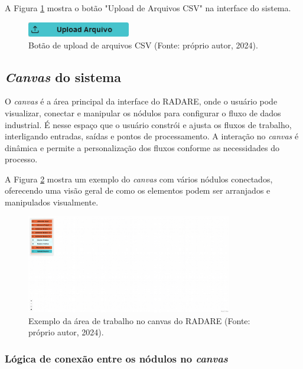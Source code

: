 A Figura \ref{Fig:UploadCSVButton} mostra o botão "Upload de Arquivos CSV" na interface do sistema.

\begin{figure}[htbp]
    \centering
    \includegraphics[width=0.4\textwidth]{figuras/upload-csv-button.png}
    \caption{Botão de upload de arquivos CSV (Fonte: próprio autor, 2024).}
    \label{Fig:UploadCSVButton}
\end{figure}

\subsection{\textit{Canvas} do sistema}

O \textit{canvas} é a área principal da interface do RADARE, onde o usuário pode visualizar, conectar e manipular os nódulos para configurar o fluxo de dados industrial. É nesse espaço que o usuário constrói e ajusta os fluxos de trabalho, interligando entradas, saídas e pontos de processamento. A interação no \textit{canvas} é dinâmica e permite a personalização dos fluxos conforme as necessidades do processo.

A Figura \ref{Fig:EmptyCanvas} mostra um exemplo do \textit{canvas} com vários nódulos conectados, oferecendo uma visão geral de como os elementos podem ser arranjados e manipulados visualmente.

\begin{figure}[htbp]
    \centering
    \includegraphics[width=0.8\textwidth]{figuras/empty-canvas.png}
    \caption{Exemplo da área de trabalho no canvas do RADARE (Fonte: próprio autor, 2024).}
    \label{Fig:EmptyCanvas}
\end{figure}

\subsubsection{Lógica de conexão entre os nódulos no \textit{canvas}}

